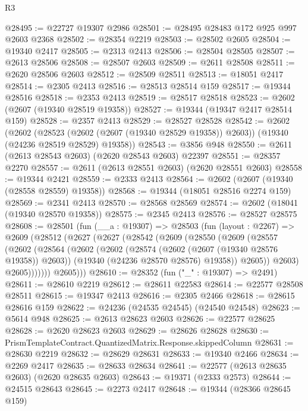 \begin{lexlean}{R3}
\begin{coremodule}
@28495 := @22727 @19307 @2986
@28501 := @28495 @28483 @172 @925 @997 @2603 @2368
@28502 := @28354 @2219
@28503 := @28502 @2605
@28504 := @19340 @2417
@28505 := @2313 @2413
@28506 := @28504 @28505
@28507 := @2613 @28506
@28508 := @28507 @2603
@28509 := @2611 @28508
@28511 := @2620 @28506 @2603
@28512 := @28509 @28511
@28513 := @18051 @2417
@28514 := @2305 @2413
@28516 := @28513 @28514 @159
@28517 := @19344 @28516
@28518 := @2353 @2413
@28519 := @28517 @28518
@28523 := @2602 (@2607 (@19340 @28519 @19358))
@28527 := @19344 (@19347 @2417 @28514 @159)
@28528 := @2357 @2413
@28529 := @28527 @28528
@28542 := @2602
    (@2602
      (@28523 (@2602 (@2607 (@19340 @28529 @19358)) @2603))
      (@19340 (@24236 @28519 @28529) @19358))
@28543 := @3856 @948
@28550 := @2611 (@2613 @28543 @2603) (@2620 @28543 @2603) @22397
@28551 := @28357 @2270
@28557 := @2611 (@2613 @28551 @2603) (@2620 @28551 @2603)
@28558 := @19344 @2421
@28559 := @2333 @2413
@28564 := @2602 (@2607 (@19340 (@28558 @28559) @19358))
@28568 := @19344 (@18051 @28516 @2274 @159)
@28569 := @2341 @2413
@28570 := @28568 @28569
@28574 := @2602 (@18041 (@19340 @28570 @19358))
@28575 := @2345 @2413
@28576 := @28527 @28575
@28608 := @28501
    (fun (__a : @19307) =>
    @28503
      (fun (layout : @2267) =>
      @2609
        (@28512
          (@2627
            (@2627
              (@28542
                (@2609
                  (@28550
                    (@2609
                      (@28557
                        (@2602
                          (@28564
                            (@2602
                              (@2602
                                (@28574 (@2602 (@2607 (@19340 @28576 @19358)) @2603))
                                (@19340 (@24236 @28570 @28576) @19358))
                              @2605))
                          @2603)
                        @2605)))))))
          @2605)))
@28610 := @28352 (fun ("_" : @19307) => @2491)
@28611 := @28610 @2219
@28612 := @28611 @22583
@28614 := @22577 @28508 @28511
@28615 := @19347 @2413
@28616 := @2305 @2466
@28618 := @28615 @28616 @159
@28622 := @24236 (@24535 @24545) (@24540 @24548)
@28623 := @5614 @948
@28625 := @2613 @28623 @2603
@28626 := @22577 @28625
@28628 := @2620 @28623 @2603
@28629 := @28626 @28628
@28630 := PrismTemplateContract.QuantizedMatrix.Response.skippedColumn
@28631 := @28630 @2219
@28632 := @28629 @28631
@28633 := @19340 @2466
@28634 := @2269 @2417
@28635 := @28633 @28634
@28641 := @22577 (@2613 @28635 @2603) (@2620 @28635 @2603)
@28643 := @19371 (@2333 @2573)
@28644 := @24515 @28643
@28645 := @2273 @2417
@28648 := @19344 (@28366 @28645 @159)

\end{coremodule}
\end{lexlean}
